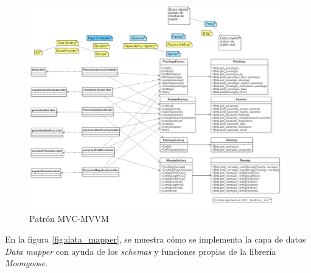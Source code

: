 \begin{landscape}

\begin{figure}[htbp] 
    \centering
    \includegraphics[height=\textwidth,keepaspectratio]{figuras/diagrama/MVC.png}
    \caption{Patrón MVC-MVVM}
    \label{fig:mvc_mvvm_sist}
\end{figure}	

\end{landscape}


En la figura \ref{fig:data_mapper}, se muestra cómo se implementa la capa de datos \textit{Data mapper} con ayuda de los \textit{schemas} y funciones propias de la librería \textit{Moongoose}.



